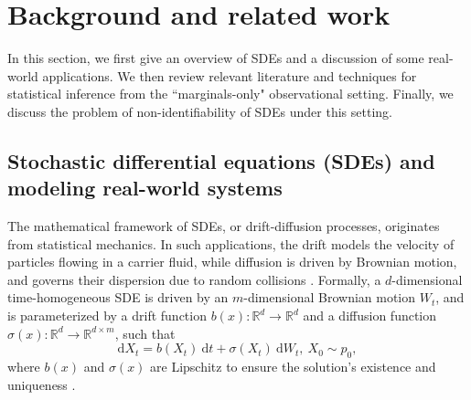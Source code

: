 \documentclass[twoside,11pt]{article}
\newcommand{\R} {\mathbb R}
\begin{document}
\section{Background and related work}
In this section, we first give an overview of SDEs and a discussion of some real-world applications. We then review relevant literature and techniques for statistical inference from the ``marginals-only" observational setting. Finally, we discuss the problem of non-identifiability of SDEs under this setting.

\subsection{Stochastic differential equations (SDEs) and modeling real-world systems}
The mathematical framework of SDEs, or drift-diffusion processes, originates from statistical mechanics. In such applications, the drift models the velocity of particles flowing in a carrier fluid, while diffusion is driven by Brownian motion, and governs their dispersion due to random collisions \citep{einstein1956investigations, macinnes1992stochastic}. Formally, a $d$-dimensional time-homogeneous SDE is driven by an $m$-dimensional Brownian motion $W_t$, and is parameterized by a drift function $b(x): \R^d \to \R^d$ and a diffusion function $\sigma(x): \R^d \to \R^{d \times m}$, such that
\begin{equation}
    \mathrm{d}X_t = b(X_t) \:\mathrm{d}t+ \sigma(X_t)\: \mathrm{d}W_t, \  X_0 \sim p_0,
    \label{eq: general_SDE}
\end{equation}
where $b(x)$ and $\sigma(x)$ are Lipschitz to ensure the solution's existence and uniqueness \citep{fang2020adaptive}.
\end{document}
